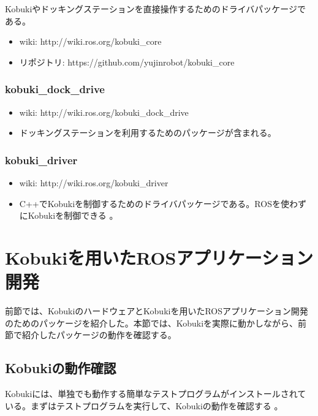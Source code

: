 Kobukiやドッキングステーションを直接操作するためのドライバパッケージである。

\begin{itemize}
\item wiki: http://wiki.ros.org/kobuki\_core
\item リポジトリ: https://github.com/yujinrobot/kobuki\_core
\end{itemize}

\subsubsection{kobuki\_dock\_drive}

\begin{itemize}
\item wiki: http://wiki.ros.org/kobuki\_dock\_drive
\item ドッキングステーションを利用するためのパッケージが含まれる。
\end{itemize}

\subsubsection{kobuki\_driver}

\begin{itemize}
\item wiki: http://wiki.ros.org/kobuki\_driver
\item C++でKobukiを制御するためのドライバパッケージである。ROSを使わずにKobukiを制御できる  。
\end{itemize}

\section{Kobukiを用いたROSアプリケーション開発}

前節では、KobukiのハードウェアとKobukiを用いたROSアプリケーション開発  のためのパッケージを紹介した。本節では、Kobukiを実際に動かしながら、前節で紹介したパッケージの動作を確認する。

\subsection{Kobukiの動作確認}

Kobukiには、単独でも動作する簡単なテストプログラムがインストールされている。まずはテストプログラムを実行して、Kobukiの動作を確認する  。

